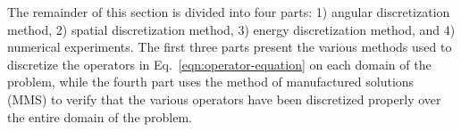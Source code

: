 \documentclass[../main.tex]{subfiles}
\begin{document}
The remainder of this section is divided into four parts: 1) \Sn angular discretization method, 2) \dG spatial discretization method, 3) \dG energy discretization method, and 4) numerical experiments. The first three parts present the various methods used to discretize the operators in Eq.~\eqref{eqn:operator-equation} on each domain of the problem, while the fourth part uses the method of manufactured solutions (MMS) to verify that the various operators have been discretized properly over the entire domain of the problem.






\end{document}
